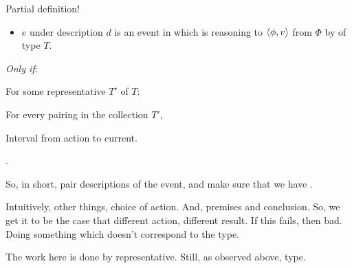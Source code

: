 \begin{note}
  {
    \color{red}
    Partial definition!
  }
  \begin{definition}[\tR{2}]
    \label{def:cmptnc}

    \noindent%

    \begin{itemize}
    \item
      \(e\) under description \(d\) is an event in which \vAgent{} is reasoning to \(\langle \phi, v \rangle\) from \(\Phi\) by \emph{} of type \(T\).
    \end{itemize}

    \emph{Only if}:

    For some representative \(T'\) of \(T\):

    For every pairing in the collection \(T'\),

    Interval from action to current.

    \pevent{}.
  \end{definition}

  So, in short, pair descriptions of the event, and make sure that we have .

  Intuitively, other things, choice of action.
  And, premises and conclusion.
  So, we get it to be the case that different action, different result.
  If this fails, then bad.
  Doing something which doesn't correspond to the type.
\end{note}

\begin{note}
  The work here is done by representative.
  Still, as observed above, type.
\end{note}


